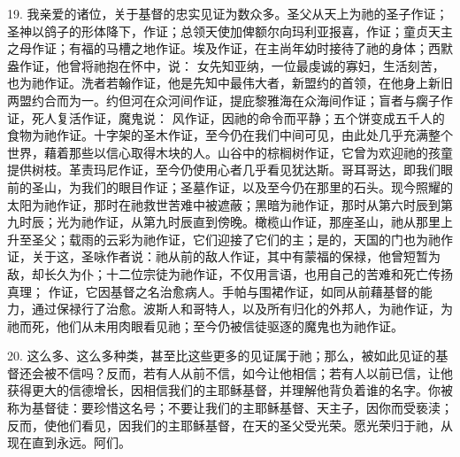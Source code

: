19. 我亲爱的诸位，关于基督的忠实见证为数众多。圣父从天上为祂的圣子作证；圣神以鸽子的形体降下，作证；总领天使加俾额尔向玛利亚报喜，作证；童贞天主之母作证；有福的马槽之地作证。埃及作证，在主尚年幼时接待了祂的身体；西默盎作证，他曾将祂抱在怀中，说： 女先知亚纳，一位最虔诚的寡妇，生活刻苦，也为祂作证。洗者若翰作证，他是先知中最伟大者，新盟约的首领，在他身上新旧两盟约合而为一。约但河在众河间作证，提庇黎雅海在众海间作证；盲者与瘸子作证，死人复活作证，魔鬼说： 风作证，因祂的命令而平静；五个饼变成五千人的食物为祂作证。十字架的圣木作证，至今仍在我们中间可见，由此处几乎充满整个世界，藉着那些以信心取得木块的人。山谷中的棕榈树作证，它曾为欢迎祂的孩童提供树枝。革责玛尼作证，至今仍使用心者几乎看见犹达斯。哥耳哥达，即我们眼前的圣山，为我们的眼目作证；圣墓作证，以及至今仍在那里的石头。现今照耀的太阳为祂作证，那时在祂救世苦难中被遮蔽；黑暗为祂作证，那时从第六时辰到第九时辰；光为祂作证，从第九时辰直到傍晚。橄榄山作证，那座圣山，祂从那里上升至圣父；载雨的云彩为祂作证，它们迎接了它们的主；是的，天国的门也为祂作证，关于这，圣咏作者说：祂从前的敌人作证，其中有蒙福的保禄，他曾短暂为敌，却长久为仆；十二位宗徒为祂作证，不仅用言语，也用自己的苦难和死亡传扬真理； 作证，它因基督之名治愈病人。手帕与围裙作证，如同从前藉基督的能力，通过保禄行了治愈。波斯人和哥特人，以及所有归化的外邦人，为祂作证，为祂而死，他们从未用肉眼看见祂；至今仍被信徒驱逐的魔鬼也为祂作证。\par

20. 这么多、这么多种类，甚至比这些更多的见证属于祂；那么，被如此见证的基督还会被不信吗？反而，若有人从前不信，如今让他相信；若有人以前已信，让他获得更大的信德增长，因相信我们的主耶稣基督，并理解他背负着谁的名字。你被称为基督徒：要珍惜这名号；不要让我们的主耶稣基督、天主子，因你而受亵渎；反而，使他们看见，因我们的主耶稣基督，在天的圣父受光荣。愿光荣归于祂，从现在直到永远。阿们。\par



